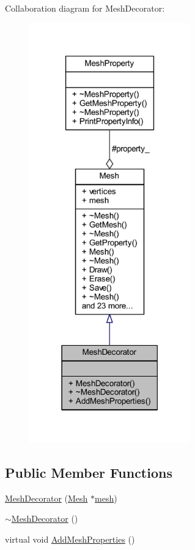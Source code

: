 Collaboration diagram for Mesh\+Decorator\+:\nopagebreak
\begin{figure}[H]
\begin{center}
\leavevmode
\includegraphics[width=197pt]{class_mesh_decorator__coll__graph}
\end{center}
\end{figure}
\subsection*{Public Member Functions}
\begin{DoxyCompactItemize}
\item 
\mbox{\hyperlink{class_mesh_decorator_ae3ceb94226ae186d6afc43e92a8befaf}{Mesh\+Decorator}} (\mbox{\hyperlink{class_mesh}{Mesh}} $\ast$\mbox{\hyperlink{class_mesh_a5878a5aeed5faa444201d58f57ef394a}{mesh}})
\item 
\mbox{\hyperlink{class_mesh_decorator_a8588a37fe17a02637652f6dbeb92426b}{$\sim$\+Mesh\+Decorator}} ()
\item 
virtual void \mbox{\hyperlink{class_mesh_decorator_a8afe0a2ff59d5c10e8b48b2307c05e53}{Add\+Mesh\+Properties}} ()
\end{DoxyCompactItemize}

